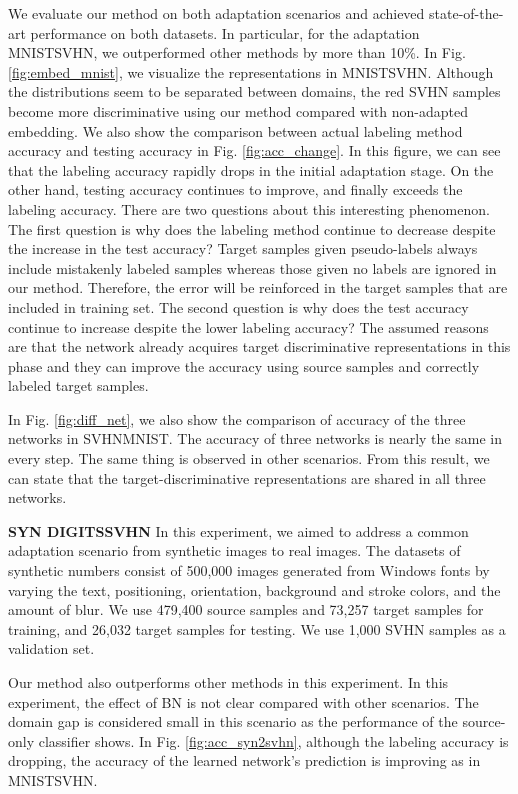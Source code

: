 \documentclass{article}
\begin{document}
We evaluate our method on both adaptation scenarios and achieved state-of-the-art performance on both datasets. In particular, for the adaptation MNISTSVHN, we outperformed other methods by more than 10\%. In Fig. \ref{fig:embed_mnist}, we visualize the representations in MNISTSVHN. Although the distributions seem to be separated between domains, the red SVHN samples become more discriminative using our method compared with non-adapted embedding. We also show the comparison between actual labeling method accuracy and testing accuracy in Fig. \ref{fig:acc_change}. In this figure, we can see that the labeling accuracy rapidly drops in the initial adaptation stage. On the other hand, testing accuracy continues to improve, and finally exceeds the labeling accuracy.
There are two questions about this interesting phenomenon. The first question is why does the labeling method continue to decrease despite the increase in the test accuracy? Target samples given pseudo-labels always include mistakenly labeled samples whereas those given no labels are ignored in our method. Therefore, the error will be reinforced in the target samples that are included in training set. The second question is why does the test accuracy continue to increase despite the lower labeling accuracy? The assumed reasons are that the network already acquires target discriminative representations in this phase and they can improve the accuracy using source samples and correctly labeled target samples.

In Fig. \ref{fig:diff_net}, we also show the comparison of accuracy of the three networks  in SVHNMNIST. The accuracy of three networks is nearly the same in every step. The same thing is observed in other scenarios. From this result, we can state that the target-discriminative representations are shared in all three networks. 

\textbf{SYN DIGITSSVHN}
In this experiment, we aimed to address a common adaptation scenario from synthetic images to real images. The datasets of synthetic numbers \cite{ganin2014unsupervised} consist of 500,000 images generated from Windows fonts by varying the text, positioning, orientation, background and stroke colors, and the amount of blur. We use 479,400 source samples and 73,257 target samples for training, and 26,032 target samples for testing. We use 1,000 SVHN samples as a validation set.

Our method also outperforms other methods in this experiment.  In this experiment, the effect of BN is not clear compared with other scenarios. The domain gap is considered small in this scenario as the performance of the source-only classifier shows. In Fig. \ref{fig:acc_syn2svhn}, although the labeling accuracy is dropping, the accuracy of the learned network's prediction is improving as in MNISTSVHN.
\end{document}
